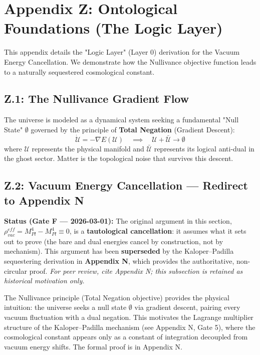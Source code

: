 \section{Appendix Z: Ontological Foundations (The Logic Layer)}
\label{app:ontology}

This appendix details the "Logic Layer" (Layer 0) derivation for the Vacuum Energy Cancellation. We demonstrate how the Nullivance objective function leads to a naturally sequestered cosmological constant.

\subsection{Z.1: The Nullivance Gradient Flow}
The universe is modeled as a dynamical system seeking a fundamental "Null State" $\emptyset$ governed by the principle of \textbf{Total Negation} (Gradient Descent):
\begin{equation}
    \dot{\mathcal{U}} = -\nabla E(\mathcal{U}) \quad \implies \quad \mathcal{U} + \bar{\mathcal{U}} \to \emptyset
\end{equation}
where $\mathcal{U}$ represents the physical manifold and $\bar{\mathcal{U}}$ represents its logical anti-dual in the ghost sector. Matter is the topological noise that survives this descent.

\subsection{Z.2: Vacuum Energy Cancellation — Redirect to Appendix N}
\begin{mdframed}[backgroundcolor=yellow!10, linecolor=orange!80!black, linewidth=1.5pt]
\textbf{Status (Gate F — 2026-03-01):} The original argument in this section,
$\rho_{vac}^{eff} = M_{Pl}^4 - M_{Pl}^4 \equiv 0$,
is a \textbf{tautological cancellation}: it assumes what it sets out to prove
(the bare and dual energies cancel by construction, not by mechanism).
This argument has been \textbf{superseded} by the Kaloper--Padilla sequestering
derivation in \textbf{Appendix N}, which provides the authoritative, non-circular proof.
\textit{For peer review, cite Appendix N; this subsection is retained as historical motivation only.}
\end{mdframed}

The Nullivance principle (Total Negation objective) provides the physical intuition: the universe seeks a null state $\emptyset$ via gradient descent, pairing every vacuum fluctuation with a dual negation. This motivates the Lagrange multiplier structure of the Kaloper--Padilla mechanism (see Appendix N, Gate 5), where the cosmological constant appears only as a constant of integration decoupled from vacuum energy shifts. The formal proof is in Appendix N.
